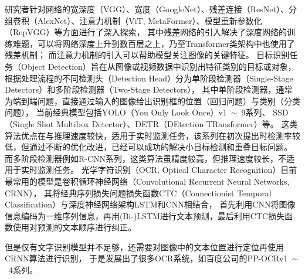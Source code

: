 研究者针对网络的宽深度（VGG）、宽度（GoogleNet）、残差连接（ResNet）、分组卷积（AlexNet）、注意力机制（ViT, MetaFormer）、模型重新参数化（RepVGG）等方面进行了深入探索，
其中残差网络的引入解决了深度网络的训练难题，可以将网络深度上升到数百层之上，乃至Transformer类架构中也使用了残差机制；
而注意力机制的引入可以帮助模型关注图像的关键特征。
目标识别任务（Object Detection）旨在从图像或视频数据中识别出特征类别的目标或对象，
根据处理流程的不同检测头（Detection Head）分为单阶段检测器（Single-Stage Detectors）和多阶段检测器（Two-Stage Detectors），
其中单阶段检测器，通常为端到端问题，直接通过输入的图像给出识别框的位置（回归问题）与类别（分类问题），
当前经典模型包括YOLO（You Only Look Once）v1~$\sim$~9系列、
SSD（Single Shot Multibox Detector）、DETR（DEtection TRansformer）等。
这类算法优点在与推理速度较快，适用于实时监测任务，该系列在初次提出时检测率较低，但通过不断的优化改进，已经可以成功的解决小目标检测和重叠目标问题。
而多阶段检测器例如R-CNN系列，这类算法虽精度较高，但推理速度较长，不适用于实时监测任务。
光学字符识别（OCR, Optical Character Recognition）目前最常用的模型是卷积循环神经网络（Convolutional Recurrent Neural Networks, CRNN），
其将经典序列损失问题损失函数CTC（Connectionist Temporal Classification）与深度神经网络架构LSTM和CNN相结合，
首先利用CNN将图像信息编码为一维序列信息，再用(Bi-)LSTM进行文本预测，最后利用CTC损失函数使用对预测的文本顺序进行纠正。

但是仅有文字识别模型并不足够，还需要对图像中的文本位置进行定位再使用CRNN算法进行识别，
于是发展出了很多OCR系统，如百度公司的PP-OCRv1~$\sim$~4系列。

